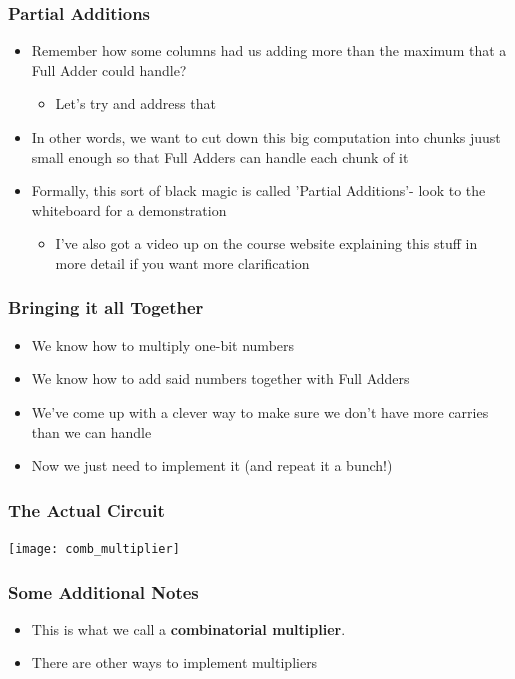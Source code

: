 \documentclass{beamer}
\begin{document}
    	\begin{frame}
    		
    			\frametitle{Partial Additions}
    			\begin{itemize}
    				\item Remember how some columns had us adding more than the maximum that a Full Adder could handle? 
    				\begin{itemize}
    					\item Let's try and address that
					\end{itemize}
    				\item In other words, we want to cut down this big computation into chunks juust small enough so that Full Adders can handle each chunk of it
    				\item Formally, this sort of black magic is called 'Partial Additions'- look to the whiteboard for a demonstration
    				\begin{itemize}
    					\item I've also got a video up on the course website explaining this stuff in more detail if you want more clarification
    				\end{itemize}
    			\end{itemize}
    		
    	\end{frame}
    	
    	\begin{frame}
    		\frametitle{Bringing it all Together}
    		\begin{itemize}
    			\item We know how to multiply one-bit numbers
    			\item We know how to add said numbers together with Full Adders
    			\item We've come up with a clever way to make sure we don't have more carries than we can handle
    			\item Now we just need to implement it (and repeat it a bunch!)
    		\end{itemize}
    	\end{frame}
    	
    	\begin{frame}
    		\frametitle{The Actual Circuit}
    		\centering
    		\texttt{[image: comb\_multiplier]}
    	\end{frame}
    	
    	\begin{frame}
    		\frametitle{Some Additional Notes}
    		\begin{itemize}
    			\item This is what we call a \textbf{combinatorial multiplier}.
    			\item There are other ways to implement multipliers
    		\end{itemize}
    	\end{frame}
    	
\end{document}
